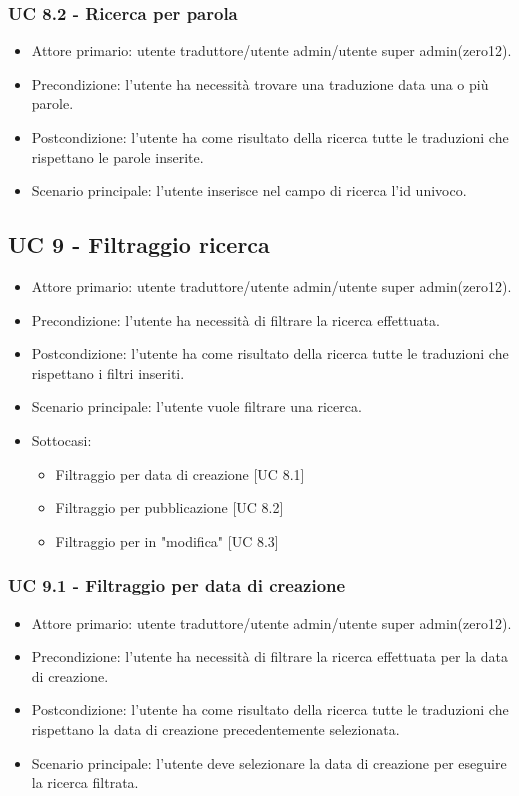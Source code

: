     \subsubsection{UC 8.2 - Ricerca per parola}
        \begin{itemize}
            \item Attore primario: utente traduttore/utente admin/utente super admin(zero12).
            \item Precondizione: l'utente ha necessità trovare una traduzione data una o più parole.
            \item Postcondizione: l'utente ha come risultato della ricerca tutte le traduzioni che rispettano le parole inserite.
            \item Scenario principale: l'utente inserisce nel campo di ricerca l'id univoco.
        \end{itemize}
\subsection{UC 9 - Filtraggio ricerca} %
    \begin{itemize}
        \item Attore primario: utente traduttore/utente admin/utente super admin(zero12).
        \item Precondizione: l'utente ha necessità di filtrare la ricerca effettuata.
        \item Postcondizione: l'utente ha come risultato della ricerca tutte le traduzioni che rispettano i filtri inseriti.
        \item Scenario principale: l'utente vuole filtrare una ricerca.
        \item Sottocasi:
            \begin{itemize}
                \item Filtraggio per data di creazione [UC 8.1]
                \item Filtraggio per pubblicazione [UC 8.2]
                \item Filtraggio per in "modifica" [UC 8.3]
            \end{itemize}
    \end{itemize}  
    \subsubsection{UC 9.1 - Filtraggio per data di creazione}
        \begin{itemize}
            \item Attore primario: utente traduttore/utente admin/utente super admin(zero12).
            \item Precondizione: l'utente ha necessità di filtrare la ricerca effettuata per la data di creazione.
            \item Postcondizione: l'utente ha come risultato della ricerca tutte le traduzioni che rispettano la data di creazione precedentemente selezionata. 
            \item Scenario principale: l'utente deve selezionare la data di creazione per eseguire la ricerca filtrata.
        \end{itemize}
